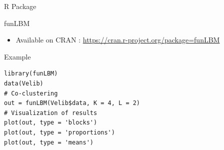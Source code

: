 \documentclass[10pt]{beamer}
\begin{document}
\begin{frame}[fragile]{R Package}
\begin{block}{funLBM}
\begin{itemize}
	\item Available on CRAN : \url{https://cran.r-project.org/package=funLBM}
\end{itemize}
\end{block}
\begin{block}{Example}
\lstset{language=R}
\begin{lstlisting}
library(funLBM)
data(Velib)
# Co-clustering
out = funLBM(Velib$data, K = 4, L = 2)
# Visualization of results
plot(out, type = 'blocks')
plot(out, type = 'proportions')
plot(out, type = 'means')
\end{lstlisting}
\end{block}
\end{frame}
\end{document}

